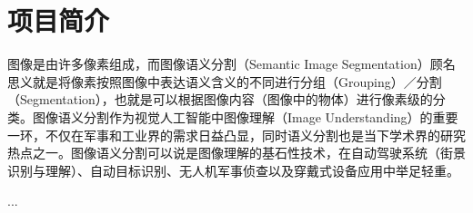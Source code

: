 



\section{项目简介}

图像是由许多像素组成，而图像语义分割（Semantic Image Segmentation）顾名思义就是将像素按照图像中表达语义含义的不同进行分组（Grouping）／分割（Segmentation），也就是可以根据图像内容（图像中的物体）进行像素级的分类。图像语义分割作为视觉人工智能中图像理解（Image Understanding）的重要一环，不仅在军事和工业界的需求日益凸显，同时语义分割也是当下学术界的研究热点之一。图像语义分割可以说是图像理解的基石性技术，在自动驾驶系统（街景识别与理解）、自动目标识别、无人机军事侦查以及穿戴式设备应用中举足轻重。

...



